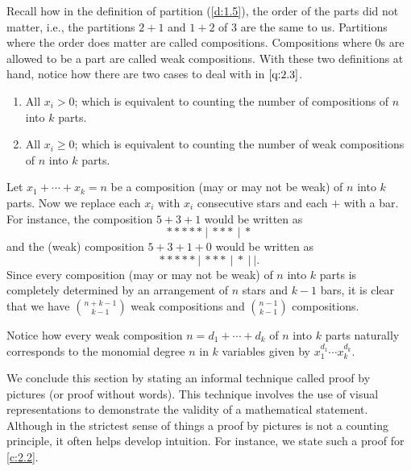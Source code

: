 \begin{solution}
Recall how in the definition of partition (\cref{d:1.5}), the order of the parts did not matter, i.e., the partitions $2+1$ and $1+2$ of $3$ are the same to us. Partitions where the order does matter are called compositions. Compositions where $0$s are allowed to be a part are called weak compositions. With these two definitions at hand, notice how there are two cases to deal with in $\cref{q:2.3}$.
\begin{enumerate}
    \item All $x_{i}>0$; which is equivalent to counting the number of compositions of $n$ into $k$ parts.
    \item All $x_{i}\geq 0$; which is equivalent to counting the number of weak compositions of $n$ into $k$ parts.
\end{enumerate}
Let $x_1+\cdots+x_k=n$ be a composition (may or may not be weak) of $n$ into $k$ parts. Now we replace each $x_i$ with $x_i$ consecutive stars and each $+$ with a bar. For instance, the composition $5+3+1$ would be written as \[
***** \ | \ *** \ | \ *
\] and the (weak) composition $5+3+1+0$ would be written as 
\[
***** \ | \ *** \ | \ * \ | \ |.
\]
Since every composition (may or may not be weak) of $n$ into $k$ parts is completely determined by an arrangement of $n$ stars and $k-1$ bars, it is clear that we have $\binom{n+k-1}{k-1}$ weak compositions and $\binom{n-1}{k-1}$ compositions.
\end{solution}
\begin{remark}
Notice how every weak composition $n=d_1+\cdots+d_k$ of $n$ into $k$ parts naturally corresponds to the monomial degree $n$ in $k$ variables given by $x_1^{d_1}\cdots x_k^{d_k}$.
\end{remark}
We conclude this section by stating an informal technique called proof by pictures (or proof without words). This technique involves the use of visual representations to demonstrate the validity of a mathematical statement. Although in the strictest sense of things a proof by pictures is not a counting principle, it often helps develop intuition. For instance, we state such a proof for \cref{c:2.2}. 
